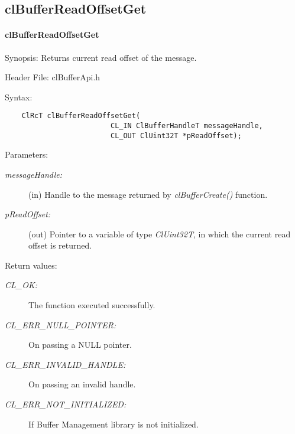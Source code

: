 \subsection{clBufferReadOffsetGet}
\hypertarget{pagebuf117}{}\paragraph{cl\-Buffer\-Read\-Offset\-Get}\label{pagebuf117}
\begin{Desc}
\item[Synopsis:]Returns current read offset of the message.\end{Desc}
\begin{Desc}
\item[Header File:]clBufferApi.h\end{Desc}
\begin{Desc}
\item[Syntax:]

\footnotesize\begin{verbatim}    ClRcT clBufferReadOffsetGet(
                         CL_IN ClBufferHandleT messageHandle,
                         CL_OUT ClUint32T *pReadOffset);
\end{verbatim}
\normalsize
\end{Desc}
\begin{Desc}
\item[Parameters:]
\begin{description}
\item[{\em message\-Handle:}](in) Handle to the message returned by \textit{clBufferCreate()} function. \item[{\em p\-Read\-Offset:}](out) Pointer to a variable of type {\em Cl\-Uint32T\/}, in which the current read offset is returned.\end{description}
\end{Desc}
\begin{Desc}
\item[Return values:]
\begin{description}
\item[{\em CL\_\-OK:}]The function executed successfully. \item[{\em CL\_\-ERR\_\-NULL\_\-POINTER:}]On passing a NULL pointer. \item[{\em CL\_\-ERR\_\-INVALID\_\-HANDLE:}]On passing an invalid handle. \item[{\em CL\_\-ERR\_\-NOT\_\-INITIALIZED:}]If Buffer Management library is not initialized.\end{description}
\end{Desc}
